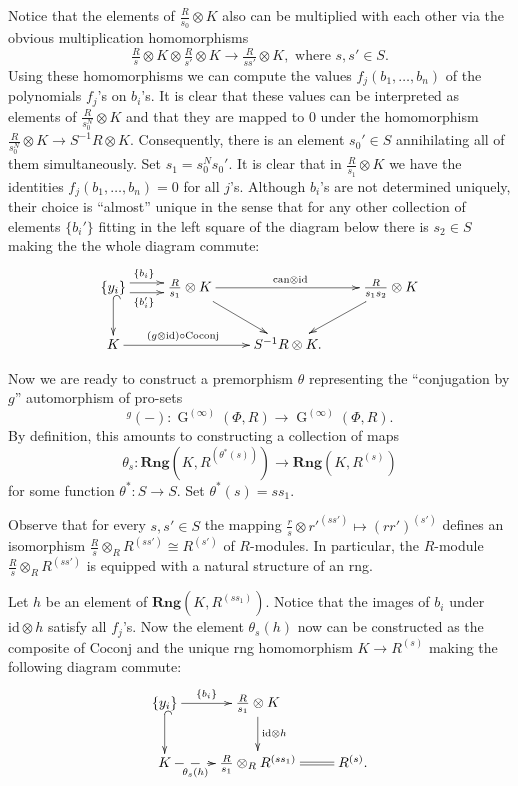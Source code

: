 \documentclass[oneside, 11pt]{amsart}
\numberwithin{equation}{section}
\theoremstyle{definition}
\theoremstyle{remark}
\DeclareMathOperator\GG{G}
\newcommand{\Rng}{\mathbf{Rng}}
\newcommand{\up}[2]{{^{#1}\!{#2}}}
\begin{document}
Notice that the elements of $\tfrac R {s_0} \otimes K$ also can be multiplied with each other via the obvious multiplication homomorphisms
\[ \tfrac R {s} \otimes K \otimes \tfrac R {s'} \otimes K \to \tfrac R {ss'} \otimes K,\text{ where } s,s'\in S. \]
Using these homomorphisms we can compute the values $f_j(b_1,\ldots, b_n)$ of the polynomials $f_j$'s on $b_i$'s.
It is clear that these values can be interpreted as elements of $\frac R {s_0^N}\otimes K$ and that they are mapped to $0$ under the homomorphism $\frac R {s_0^N} \otimes K \to S^{-1}R \otimes K$. Consequently, there is an element $s_0' \in S$ annihilating all of them simultaneously. Set $s_1 = s_0^N s_0'$. It is clear that in $\frac R{s_1} \otimes K$ we have the identities \(f_j(b_1, \ldots, b_n) = 0\) for all \(j\)'s. Although $b_i$'s are not determined uniquely, their choice is ``almost'' unique in the sense that for any other collection of elements $\{b_i'\}$ fitting in the left square of the diagram below there is $s_2\in S$ making the the whole diagram commute:
\begin{equation} \label{eq:bis} \begin{aligned} \xymatrix{ \{y_i\} \ar@<3.5pt>[r]^(0.4){\{b_i\}} \ar@<-3.5pt>[r]_(0.4){\{b_i'\}} \ar@{^{(}->}[d] & \tfrac R {s_1} \otimes K \ar[rd] \ar[rr]^{\mathrm{can}\otimes \mathrm{id}} & & \tfrac R {s_1 s_2} \otimes K \ar[ld] \\ K \ar[rr]^(.4){(g\otimes \mathrm{id})\circ \mathrm{Coconj}} & & S^{-1} R \otimes K. }\end{aligned} \end{equation}

Now we are ready to construct a premorphism $\theta$ representing the ``conjugation by $g$'' automorphism of pro-sets
\begin{equation} \label{eq:conj-g} \up g{(-)} \colon \GG^{(\infty)}(\Phi, R) \to \GG^{(\infty)}(\Phi, R).\end{equation}
By definition, this amounts to constructing a collection of maps
\[\theta_{s}\colon \Rng(K, R^{(\theta^*(s))}) \to \Rng(K, R^{(s)})\]
for some function $\theta^* \colon S \to S$. Set $\theta^*(s) = ss_1$.

Observe that for every \(s, s' \in S\) the mapping $ \frac rs \otimes {r'}^{(ss')} \mapsto (rr')^{(s')}$ defines an isomorphism \(\frac Rs \otimes_R R^{(ss')} \cong R^{(s')}\) of $R$-modules. In particular, the \(R\)-module \(\frac Rs \otimes_R R^{(ss')}\) is equipped with a natural structure of an rng.

Let $h$ be an element of $\Rng(K, R^{(ss_1)})$.
Notice that the images of $b_i$ under $\mathrm{id}\otimes h$ satisfy all $f_j$'s.
Now the element $\theta_s(h)$ now can be constructed as the composite of $\mathrm{Coconj}$ and the unique rng homomorphism $K \to R^{(s)}$ making the following diagram commute:
\[ \xymatrix{ \{ y_i\} \ar@{^{(}->}[d] \ar[r]^(0.45){\{b_i\}} & \tfrac R {s_1} \otimes K \ar[d]^{\mathrm{id} \otimes h} \\
               K \ar@{-->}[r]_(0.33){\theta_s(h)} & \tfrac R {s_1} \otimes_R R^{(ss_1)} \ar@{=}[r] & R^{(s)}. } \]
\end{document}
